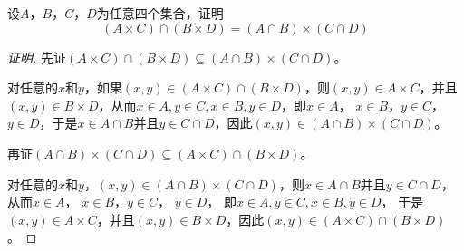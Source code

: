 \documentclass{beamer}
\begin{document}
\begin{CJK*}{UTF8}{gbsn}
\begin{frame}
    \begin{Exercise}
    设$A$，$B$，$C$，$D$为任意四个集合，证明
        \[(A\times C)\cap (B \times D) = (A\cap B) \times (C \cap D)\]
\end{Exercise}
\pause
\begin{proof}[证明]\justifying\let\raggedright\justifying

先证$(A\times C)\cap (B \times D)\subseteq (A\cap B) \times (C \cap D)$。

对任意的$x$和$y$，如果$(x,y)\in (A\times C)\cap (B \times D)$，则$(x,y)\in A\times C$，并且$(x,y)\in B \times D$，从而$x\in A,y\in C, x \in B, y\in D$，即$x\in A$， $x \in B$，$ y\in C$， $y\in D$，于是$x \in A\cap B$并且$y \in C \cap D$，因此$(x,y) \in (A\cap B) \times (C \cap D)$。

再证$(A\cap B) \times (C \cap D) \subseteq (A\times C)\cap (B \times D)$。

  对任意的$x$和$y$，$(x,y) \in (A\cap B) \times (C \cap D)$，则$x\in A\cap B$并且$y \in C \cap D$，从而$x\in A$， $x \in B$，$ y\in C$， $y\in D$， 即$x\in A,y\in C, x \in B, y\in D$，
于是$(x,y)\in A\times C$，并且$(x,y)\in B \times D$，因此$(x,y)\in (A\times C)\cap (B \times D)$。

\end{proof}
\end{frame}


\end{CJK*}
\end{document}
